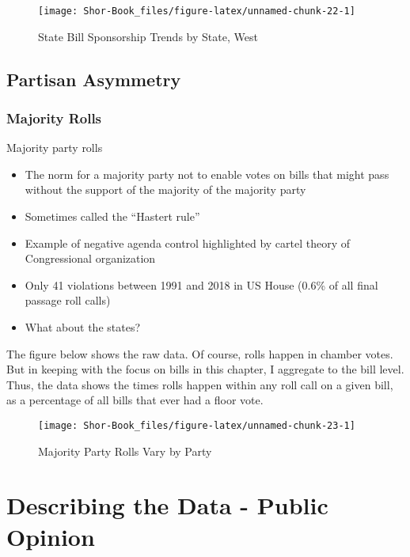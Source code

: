 \documentclass[
  oneside]{book}
\providecommand{\tightlist}{%
  \setlength{\itemsep}{0pt}\setlength{\parskip}{0pt}}
\begin{document}
\begin{figure}
\texttt{[image: Shor-Book\_files/figure-latex/unnamed-chunk-22-1]} \caption{State Bill Sponsorship Trends by State, West}\label{fig:unnamed-chunk-22}
\end{figure}

\hypertarget{partisan-asymmetry}{%
\section{Partisan Asymmetry}\label{partisan-asymmetry}}

\hypertarget{majority-rolls}{%
\subsection{Majority Rolls}\label{majority-rolls}}

Majority party rolls

\begin{itemize}
\tightlist
\item
  The norm for a majority party not to enable votes on bills that might pass without the support of the majority of the majority party
\item
  Sometimes called the ``Hastert rule''
\item
  Example of negative agenda control highlighted by cartel theory of Congressional organization
\item
  Only 41 violations between 1991 and 2018 in US House (0.6\% of all final passage roll calls)
\item
  What about the states? \citep{Anzia:2013}
\end{itemize}

The figure below shows the raw data. Of course, rolls happen in chamber votes. But in keeping with the focus on bills in this chapter, I aggregate to the bill level. Thus, the data shows the times rolls happen within any roll call on a given bill, as a percentage of all bills that ever had a floor vote.

\begin{figure}
\texttt{[image: Shor-Book\_files/figure-latex/unnamed-chunk-23-1]} \caption{Majority Party Rolls Vary by Party}\label{fig:unnamed-chunk-23}
\end{figure}

\hypertarget{describing-the-data---public-opinion}{%
\chapter{Describing the Data - Public Opinion}\label{describing-the-data---public-opinion}}
\end{document}
